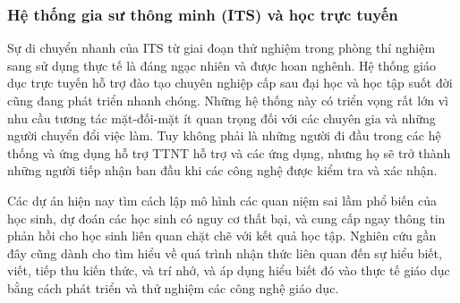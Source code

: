 \subsubsection{Hệ thống gia sư thông minh (ITS) và học trực tuyến}
Sự di chuyển nhanh của ITS từ giai đoạn thử nghiệm trong phòng thí nghiệm sang sử dụng thực tế là đáng ngạc nhiên và được hoan nghênh. Hệ thống giáo dục trực tuyến hỗ trợ đào tạo chuyên nghiệp cấp sau đại học và học tập suốt đời cũng đang phát triển nhanh chóng. Những hệ thống này có triển vọng rất lớn vì nhu cầu tương tác mặt-đối-mặt ít quan trọng đối với các chuyên gia và những người chuyển đổi việc làm. Tuy không phải là những người đi đầu trong các hệ thống và ứng dụng hỗ trợ TTNT hỗ trợ và các ứng dụng, nhưng họ sẽ trở thành những người tiếp nhận ban đầu khi các công nghệ được kiểm tra và xác nhận.\par
Các dự án hiện nay tìm cách lập mô hình các quan niệm sai lầm phổ biến của học sinh, dự đoán các học sinh có nguy cơ thất bại, và cung cấp ngay thông tin phản hồi cho học sinh liên quan chặt chẽ với kết quả học tập. Nghiên cứu gần đây cũng dành cho tìm hiểu về quá trình nhận thức liên quan đến sự hiểu biết, viết, tiếp thu kiến thức, và trí nhớ, và áp dụng hiểu biết đó vào thực tế giáo dục bằng cách phát triển và thử nghiệm các công nghệ giáo dục.


